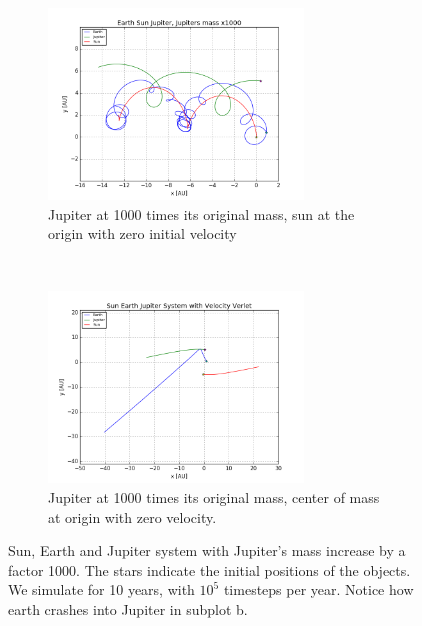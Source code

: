 \documentclass[a4paper, 10pt]{article}
\begin{document}
\begin{figure}[!ht]
    \centering
    \begin{subfigure}[H!]{0.5\textwidth}
        \centering
        \includegraphics[height=2.0in]{orbitESJ1000.png}
        \caption{Jupiter at 1000 times its original mass, sun at the origin with zero initial velocity}
    \end{subfigure}%
    ~ 
    \begin{subfigure}[H!]{0.5\textwidth}
        \centering
        \includegraphics[height=2.0in]{orbitSEJMCAtOri.png}
        \caption{Jupiter at 1000 times its original mass, center of mass at origin with zero velocity.}
    \end{subfigure}
    \caption{Sun, Earth and Jupiter system with Jupiter's mass increase by a factor 1000. The stars indicate the initial positions of the objects. We simulate for 10 years, with $10^5$ timesteps per year. Notice how earth crashes into Jupiter in subplot b.}\label{fig:Jupiter1000}
\end{figure}
\newpage
\end{document}
